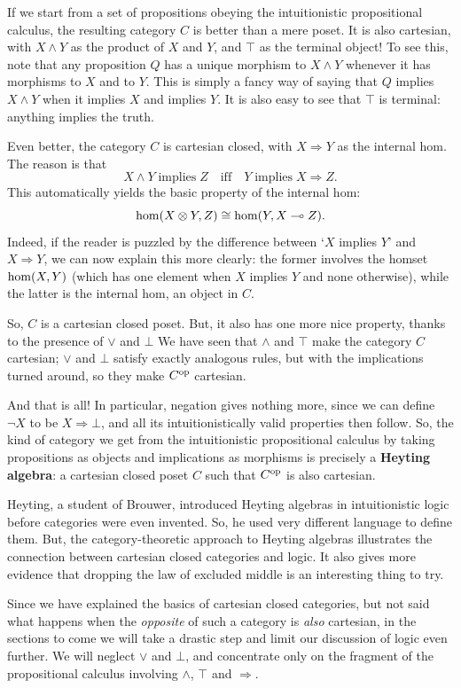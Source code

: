 \documentclass[12pt,twoside,openright]{report}
\newcommand{\lhom}{\multimap}
\renewcommand{\hom}{{\rm hom}}
\newcommand{\tensor}{\otimes}
\newcommand{\op}{{\rm op}}
\renewcommand{\text}{\mbox}
\begin{document}
If we start from a set of propositions obeying the intuitionistic propositional calculus, the resulting category $C$ is better than a mere poset.  It is also cartesian, with $X \wedge Y$ as the product of $X$ and $Y$, and $\top$ as the terminal object!  To see this, note that any proposition $Q$ has a unique morphism to $X \wedge Y$ whenever it has morphisms to $X$ and to $Y$.  This is simply a fancy way of saying that $Q$ implies $X \wedge Y$ when it implies $X$ and implies $Y$. It is also easy to see that $\top$ is terminal: anything implies the truth.  

Even better, the category $C$ is cartesian closed, with 
$ X \Rightarrow Y$ as the internal hom.  The reason is that 
\[  X \wedge Y \; \text{implies}\; Z \quad \text{iff} \quad Y 
\; \text{implies} \; X \Rightarrow Z .\]
This automatically yields the basic property of the internal hom:
\[ \hom(X\tensor Y, Z) \cong \hom(Y,X \lhom Z)  . \]
Indeed, if the reader is puzzled by the difference between 
`$X$ implies $Y$' and $X \Rightarrow Y$, we can now explain this more clearly: the former involves the homset $\hom(X,Y)$ 
(which has one element when $X$ implies $Y$ and none otherwise), while the latter is the internal hom, an object in $C$.

So, $C$ is a cartesian closed poset.  But, it also has one more nice property, thanks to the presence of $\vee$ and $\bot$
We have seen that $\wedge$ and $\top$ make the category $C$ cartesian; 
$\vee$ and $\bot$ satisfy exactly analogous rules, but with the implications turned around, so they make $C^\op$ cartesian.  

And that is all!  In particular, negation gives nothing more, since we can define $\neg X$ to be $X \Rightarrow \bot$, and all its intuitionistically valid properties then follow.  So, the kind of category we get from the intuitionistic propositional calculus by taking propositions as objects and implications as morphisms is precisely a {\bf Heyting algebra}: a cartesian closed poset $C$ such that $C^\op$ is also cartesian.

Heyting, a student of Brouwer, introduced Heyting algebras in intuitionistic logic before categories were even invented. So, he used very different language to define them.   But, the category-theoretic approach to Heyting algebras illustrates the connection between cartesian closed categories and logic. It also gives more evidence that dropping the law of excluded middle is an interesting thing to try.

Since we have explained the basics of cartesian closed categories, but not said what happens when the {\it opposite} of such a category is {\it also} cartesian, in the sections to come we will take a drastic step and limit our discussion of logic even further. We will neglect $\vee$ and $\bot$, and concentrate only on the fragment of the propositional calculus involving $\wedge$, $\top$ and 
$\Rightarrow$.  
\end{document}
